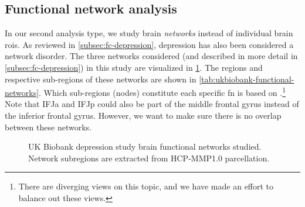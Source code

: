 \subsection{Functional network analysis}\label{subsec:ukb-fn-analysis}

In our second analysis type, we study brain \emph{networks} instead of individual brain \glspl{roi}.
As reviewed in \cref{subsec:fc-depression}, depression has also been considered a network disorder.
%
The three networks considered (and described in more detail in \cref{subsec:fc-depression}) in this study are visualized in \cref{fig:ukb-brain-functional-networks}.
The regions and respective sub-regions of these networks are shown in \cref{tab:ukbiobank-functional-networks}.
Which sub-regions (nodes) constitute each specific \gls{fn} is based on \textcite{Fan2016, Uddin2019, Oane2020}.\footnote{There are diverging views on this topic, and we have made an effort to balance out these views.}
Note that IFJa and IFJp could also be part of the middle frontal gyrus instead of the inferior frontal gyrus.
However, we want to make sure there is no overlap between these networks.


\begin{figure}[t]
  \centering
  \caption{
    UK Biobank depression study brain functional networks studied.
    Network subregions are extracted from HCP-MMP1.0 parcellation.
  }\label{fig:ukb-brain-functional-networks}
\end{figure}


